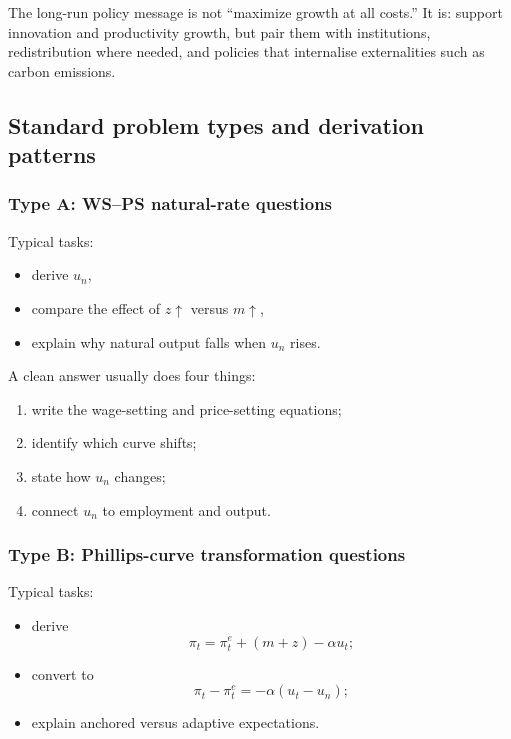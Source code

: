 \documentclass[12pt]{article}
\begin{document}
\begin{policynote}
The long-run policy message is not ``maximize growth at all costs.'' It is: support innovation and productivity growth, but pair them with institutions, redistribution where needed, and policies that internalise externalities such as carbon emissions.
\end{policynote}

\subsection{Standard problem types and derivation patterns}

\subsubsection*{Type A: WS--PS natural-rate questions}

Typical tasks:
\begin{itemize}[leftmargin=1.5em]
    \item derive $u_n$,
    \item compare the effect of $z\uparrow$ versus $m\uparrow$,
    \item explain why natural output falls when $u_n$ rises.
\end{itemize}

\begin{examtip}[title={Exam Focus: Standard script for WS--PS}]
A clean answer usually does four things:
\begin{enumerate}[leftmargin=1.5em]
    \item write the wage-setting and price-setting equations;
    \item identify which curve shifts;
    \item state how $u_n$ changes;
    \item connect $u_n$ to employment and output.
\end{enumerate}
\end{examtip}

\subsubsection*{Type B: Phillips-curve transformation questions}

Typical tasks:
\begin{itemize}[leftmargin=1.5em]
    \item derive
    \[
    \pi_t=\pi_t^e+(m+z)-\alpha u_t;
    \]
    \item convert to
    \[
    \pi_t-\pi_t^e=-\alpha(u_t-u_n);
    \]
    \item explain anchored versus adaptive expectations.
\end{itemize}
\end{document}
